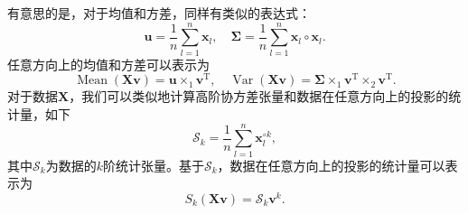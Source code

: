 有意思的是，对于均值和方差，同样有类似的表达式：
\[
    \bm{u} = \frac{1}{n} \sum_{l=1}^n \bm{x}_l, \quad \mathbf{\Sigma} = \frac{1}{n} \sum_{l=1}^n \bm{x}_l \circ \bm{x}_l.
\]
任意方向上的均值和方差可以表示为
\[
    \operatorname{Mean}(\mathbf{X} \bm{v}) = \bm{u} \times_1 \bm{v}^{\mathrm{T}}, \quad \operatorname{Var}(\mathbf{X} \bm{v}) = \mathbf{\Sigma} \times_1 \bm{v}^{\mathrm{T}} \times_2 \bm{v}^{\mathrm{T}}.
\]
对于数据\( \mathbf{X} \)，我们可以类似地计算高阶协方差张量和数据在任意方向上的投影的统计量，如下
\[
    \mathcal{S}_k = \frac{1}{n} \sum_{l=1}^n \bm{x}_l^{\circ k},
\]
其中\( \mathcal{S}_k \)为数据的\( k \)阶统计张量。基于\( \mathcal{S}_k \)，数据在任意方向上的投影的统计量可以表示为
\[
    S_k(\mathbf{X} \bm{v}) = \mathcal{S}_k \bm{v}^k.
\]




